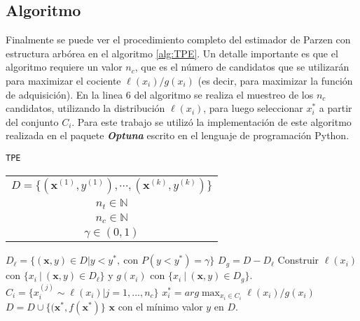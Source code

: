 
\subsection*{Algoritmo}

Finalmente se puede ver el procedimiento completo del estimador de Parzen con estructura arbórea en el algoritmo \ref{alg:TPE}. Un detalle importante es que el algoritmo requiere un valor $n_c$, que es el número de candidatos que se utilizarán para maximizar el cociente $\ell(x_i)/g(x_i)$ (es decir, para maximizar la función de adquisición). En la linea 6 del algoritmo se realiza el muestreo de los $n_c$ candidatos, utilizando la distribución $\ell(x_i)$, para luego seleccionar $x_i^*$ a partir del conjunto $C_i$.
Para este trabajo se utilizó la implementación de este algoritmo realizada en el paquete \textbf{\textit{Optuna}} \cite{optuna_2019} escrito en el lenguaje de programación Python.

\begin{algorithm}
\caption{\texttt{TPE}}
\label{alg:TPE}
\begin{algorithmic}[1]
\Require
\begin{tabular}{c}
$D = \{(\textbf{x}^{(1)},y^{(1)}), \cdots, (\textbf{x}^{(k)},y^{(k)}) \}$ \Comment{Observaciones}  \\ 
$n_t \in \mathbb{N}$ \Comment{número de iteraciones} \\ 
$n_c \in \mathbb{N}$ \Comment{número de candidatos} \\
$\gamma \in (0,1) $ \Comment{cuantil para obtener $y^*$}
\end{tabular} 

\vspace{1mm}
	\State $D_{\ell} = \{ (\textbf{x}, y) \in D | y < y^*, \ \text{con } P(y<y^*) = \gamma  \}$
	\State $D_g = D - D_{\ell}$
	 
		\State Construir $\ell(x_i)$ con $\{x_i \ | \ (\textbf{x}, y) \in D_{\ell}\}$ y $g(x_i)$ con $\{x_i \ | \ (\textbf{x}, y) \in D_g \}$.
		\State $C_i = \{ x_i^{(j)} \sim \ell(x_i)| j=1, ..., n_c \}$ 
		\State $x_{i}^* = arg \max_{x_i\in C_i} \ell(x_i)/g(x_i)$
	\EndFor
	\State $D = D \cup \{(\textbf{x}^*, f(\textbf{x}^*)\}$ 
\EndFor
\Ensure $\textbf{x}$ con el mínimo valor $y$ en $D$.
\vspace{3mm}

\end{algorithmic}
\end{algorithm}
 
